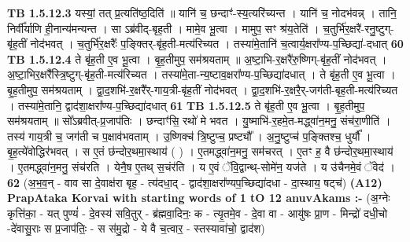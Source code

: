 \documentclass[17pt]{extarticle}
\begin{document}
                  \newline
                                \textbf{ TB 1.5.12.3} \newline
                  यस्यां॒ तत् प्र॒त्यति॑ष्ठ॒दिति॑ ॥ यानि॑ च॒ छन्दाꣳ॑-स्य॒त्यरि॑च्यन्त । यानि॑ च॒ नोदभ॑वन्न् । तानि॒ निर्वी᳚र्याणि ही॒नान्य॑मन्यन्त । सा ऽब्र॑वीद्-बृह॒ती । मामे॒व भू॒त्वा । मामुप॒ सꣳ श्र॑य॒तेति॑ । च॒तुर्भि॑र॒क्षरै॑-रनु॒ष्टुग्-बृ॑ह॒तीं नोद॑भवत् । च॒तुर्भि॑र॒क्षरैः᳚ प॒ङ्क्तिर्-बृ॑ह॒ती-मत्य॑रिच्यत । तस्या॑मे॒तानि॑ च॒त्वार्य॒क्षरा᳚ण्य-प॒च्छिद्या॑-दधात् \textbf{ 60} \newline
                  \newline
                                \textbf{ TB 1.5.12.4} \newline
                  ते बृ॑ह॒ती ए॒व भू॒त्वा । बृ॒ह॒तीमुप॒ सम॑श्रयताम् ॥ अ॒ष्टा॒भि-र॒क्षरै॑रु॒ष्णिग्-बृ॑ह॒तीं नोद॑भवत् । अ॒ष्टा॒भिर॒क्षरै᳚स्त्रि॒ष्टुग्-बृ॑ह॒ती-मत्य॑रिच्यत । तस्या॑मे॒ता-न्य॒ष्टाव॒क्षरा᳚ण्य-प॒च्छिद्या॑दधात् । ते बृ॑ह॒ती ए॒व भू॒त्वा । बृ॒ह॒तीमुप॒ सम॑श्रयताम् । द्वा॒द॒शभि॑-र॒क्षरै᳚र्-गाय॒त्री-बृ॑ह॒तीं नोद॑भवत् । द्वा॒द॒शभि॑-र॒क्षरै॒र्-जग॑ती-बृह॒ती-मत्य॑रिच्यत । तस्या॑मे॒तानि॒ द्वाद॑शा॒क्षरा᳚ण्य-प॒च्छिद्या॑दधात् \textbf{ 61} \newline
                  \newline
                                \textbf{ TB 1.5.12.5} \newline
                  ते बृ॑ह॒ती ए॒व भू॒त्वा । बृ॒ह॒तीमुप॒ सम॑श्रयताम् ॥ सो᳚ऽब्रवीत्-प्र॒जाप॑तिः । छन्दाꣳ॑सि॒ रथो॑ मे भवत । यु॒ष्माभि॑-र॒हमे॒त-मद्ध्वा॑न॒मनु॒ संच॑रा॒णीति॑ । तस्य॑ गाय॒त्री च॒ जग॑ती च प॒क्षाव॑भवताम् । उ॒ष्णिक्च॑ त्रि॒ष्टुप्च॒ प्रष्ट्यौ᳚ । अ॒नु॒ष्टुप्च॑ प॒ङ्क्तिश्च॒ धुर्यौ᳚ । बृ॒ह॒त्ये॑वोद्धिर॑भवत् । स ए॒तं छ॑न्दोर॒थमा॒स्थाय॑ ( ) । ए॒तमद्ध्वा॑न॒मनु॒ सम॑चरत् । ए॒तꣳ ह॒ वै छ॑न्दोर॒थमा॒स्थाय॑ । ए॒तमद्ध्वा॑न॒मनु॒ संच॑रति । येनै॒ष ए॒तथ् स॒चंर॑ति । य ए॒वं ॅवि॒द्वान्थ्-सोमे॑न॒ यज॑ते । य उ॑चैनमे॒वं ॅवेद॑ । \textbf{ 62} \newline
                  \newline
                                    (अ॒भ॒व॒न् - वाव सा दे॒वाक्ष॑रा बृह॒ - त्य॑दधा॒द् - द्वाद॑शा॒क्षरा᳚ण्यप॒च्छिद्या॑दधा - दा॒स्थाय॒ षट्च॑) \textbf{(A12)} \newline \newline
                \textbf{PrapAtaka Korvai with starting  words of 1 tO 12 anuvAkams :-} \newline
        (अ॒ग्नेः कृत्ति॑का॒ - यत् पुण्यं॑ - दे॒वस्य॑ सवि॒तुर् - ब्र॑ह्मवा॒दिनः॒ क - त्यृ॒तमे॒व - दे॒वा वा - आयु॑षः प्रा॒ण - मिन्द्रो॑ दधी॒चो -दे॑वासु॒राः स प्र॒जाप॑तिः॒ - स स॑मु॒द्रो - ये वै च॒त्वार॒ - स्तस्यावा॑चो॒ द्वाद॑श) \newline
\end{document}
